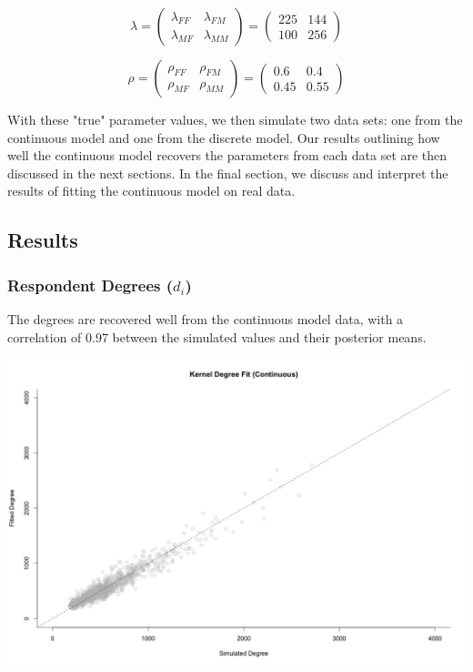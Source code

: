 \documentclass[12pt]{article}
\begin{document}
$$ \lambda
= \left( \begin{array}{cc} \lambda_{FF} & \lambda_{FM} \\
\lambda_{MF} & \lambda_{MM} \end{array} \right) 
= \left( \begin{array}{cc}
225 & 144 \\
100 & 256 \end{array} \right) $$

$$ \rho
= \left( \begin{array}{cc} \rho_{FF} & \rho_{FM} \\
\rho_{MF} & \rho_{MM} \end{array} \right) 
= \left( \begin{array}{cc}
0.6 & 0.4 \\
0.45 & 0.55 \end{array} \right) $$ \vspace{7 pt}

\noindent With these "true" parameter values, we then simulate two data sets: one from the continuous model and one from the discrete model. Our results outlining how well the continuous model recovers the parameters from each data set are then discussed in the next sections. In the final section, we discuss and interpret the results of fitting the continuous model on real data.

\pagebreak
\subsection{Results}
\subsubsection*{Respondent Degrees ($d_i$)}
\noindent The degrees are recovered well from the continuous model data, with a correlation of 0.97 between the simulated values and their posterior means.

\includegraphics[scale = 0.36]{Estimates_Degree_Continuous.png}
\end{document}
